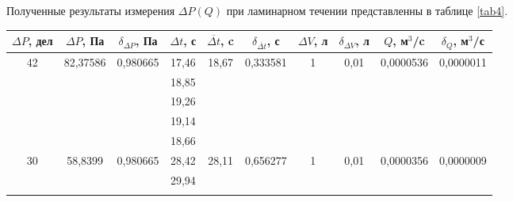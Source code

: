 \documentclass[a4paper, 12pt]{article}
\begin{document}
\par Полученные результаты измерения $\Delta{P}(Q)$ при ламинарном течении представленны в таблице \ref{tab4}.
\begin{table}[h!]
\begin{tabular}{|c|c|c|c|c|c|c|c|c|c|}
\hline
$\Delta{P}$, дел    & $\Delta{P}$, Па           & $\delta_{\Delta{P}}$, Па  & $\Delta{t}$, с & $\overline{\Delta{t}}$, c & $\delta_{\overline{\Delta{t}}}$, с & $\Delta{V}$, л     & $\delta_{\Delta{V}}$, л & $Q$, м$^3$/c      & $\delta_{Q}$, м$^3$/с \\ \hline
\multirow{5}{*}{42} & \multirow{5}{*}{82,37586} & \multirow{5}{*}{0,980665} & 17,46 & \multirow{5}{*}{18,67}         & \multirow{5}{*}{0,333581}         & \multirow{5}{*}{1} & \multirow{5}{*}{0,01} & \multirow{5}{*}{0,0000536} & \multirow{5}{*}{0,0000011}   \\ \cline{4-4}
                    &                           &                           & 18,85 &                                &                                   &                    &                       &                            &                              \\ \cline{4-4}
                    &                           &                           & 19,26 &                                &                                   &                    &                       &                            &                              \\ \cline{4-4}
                    &                           &                           & 19,14 &                                &                                   &                    &                       &                            &                              \\ \cline{4-4}
                    &                           &                           & 18,66 &                                &                                   &                    &                       &                            &                              \\ \hline
\multirow{5}{*}{30} & \multirow{5}{*}{58,8399}  & \multirow{5}{*}{0,980665} & 28,42 & \multirow{5}{*}{28,11}         & \multirow{5}{*}{0,656277}         & \multirow{5}{*}{1} & \multirow{5}{*}{0,01} & \multirow{5}{*}{0,0000356} & \multirow{5}{*}{0,0000009}   \\ \cline{4-4}
                    &                           &                           & 29,94 &                                &                                   &                    &                       &                            &                              \\ \cline{4-4}

\end{tabular}
\end{table}
\end{document}
